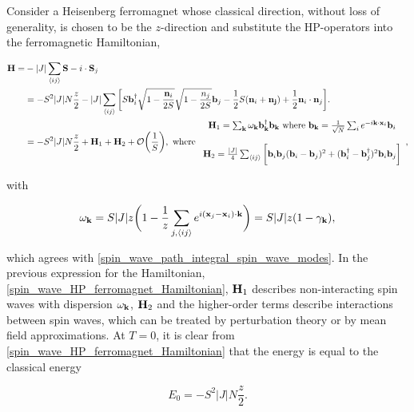 \documentclass{homework}
\begin{document}
Consider a Heisenberg ferromagnet whose classical direction, without loss of generality, is chosen to be the $z$-direction and substitute the HP-operators into the ferromagnetic Hamiltonian, 

\begin{equation}
    \begin{split}
        {\bf H} =& - |J| \sum_{\langle ij \rangle} {\bf S}-i \cdot {\bf S}_j \\
        &= - S^2 |J| N \frac{z}{2} - |J| \sum_{\langle ij \rangle} \bigg[ S {\bf b}_i^\dagger \sqrt{1 - \frac{{\bf n}_i}{2S}} \sqrt{1 - \frac{n_j}{2S}} {\bf b}_j - \frac{1}{2} S ({\bf n}_i + {\bf n_j}) + \frac{1}{2} {\bf n}_i \cdot {\bf n}_j \bigg]. \\
        &= - S^2 |J| N \frac{z}{2} + {\bf H}_1 + {\bf H}_2 + \mathcal{O}\bigg(\frac{1}{S}\bigg), \textnormal{ where } \begin{array}{cc}
             {\bf H}_1 = \sum_{{\bf k}} \omega_{{\bf k}} {\bf b}_{{\bf k}}^\dagger {\bf b}_{{\bf k}} \textnormal{ where ${\bf b}_{{\bf k}} = \frac{1}{\sqrt{N}} \sum_{i} e^{-i {\bf k} \cdot {\bf x}_i} {\bf b}_i$}  \\
             \\
             {\bf H}_2 = \frac{|J|}{4} \sum_{\langle ij  \rangle} \bigg[ {\bf b}_i {\bf b}_j ({\bf b}_i - {\bf b}_j)^2 + ({\bf b}_i^\dagger - {\bf b}_j^\dagger)^2 {\bf b}_i {\bf b}_j\bigg]
        \end{array},
    \end{split} 
    \label{spin_wave_HP_ferromagnet_Hamiltonian}
\end{equation}

with 

$$
    \omega_{{\bf k}} = S |J| z \bigg(1-\frac{1}{z} \sum_{j, \langle ij \rangle} e^{i({\bf x}_j - {\bf x}_i) \cdot {\bf k}}\bigg) = S |J| z (1 - \gamma_{{\bf k}}),
$$

which agrees with \cref{spin_wave_path_integral_spin_wave_modes}. In the previous expression for the Hamiltonian, \cref{spin_wave_HP_ferromagnet_Hamiltonian}, ${\bf H}_1$ describes non-interacting spin waves with dispersion $\omega_{{\bf k}}$, ${\bf H}_2$ and the higher-order terms describe interactions between spin waves, which can be treated by perturbation theory or by mean field approximations. At $T = 0$, it is clear from \cref{spin_wave_HP_ferromagnet_Hamiltonian} that the energy is equal to the classical energy 

$$
    E_0 = - S^2 |J| N \frac{z}{2}.
$$
\end{document}
